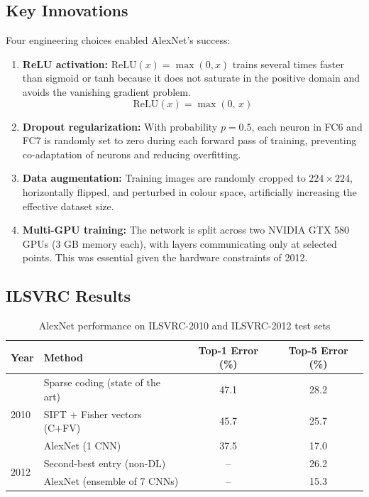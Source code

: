\documentclass[12pt,a4paper]{article}
\begin{document}
\subsection{Key Innovations}

Four engineering choices enabled AlexNet's success:

\begin{enumerate}[leftmargin=2em]
  \item \textbf{ReLU activation:} $\mathrm{ReLU}(x) = \max(0, x)$ trains several times faster than sigmoid or tanh because it does not saturate in the positive domain and avoids the vanishing gradient problem.
  \begin{equation}
    \mathrm{ReLU}(x) = \max(0,\, x)
    \label{eq:relu}
  \end{equation}
  \item \textbf{Dropout regularization:} With probability $p=0.5$, each neuron in FC6 and FC7 is randomly set to zero during each forward pass of training, preventing co-adaptation of neurons and reducing overfitting.
  \item \textbf{Data augmentation:} Training images are randomly cropped to $224\times224$, horizontally flipped, and perturbed in colour space, artificially increasing the effective dataset size.
  \item \textbf{Multi-GPU training:} The network is split across two NVIDIA GTX 580 GPUs (3 GB memory each), with layers communicating only at selected points. This was essential given the hardware constraints of 2012.
\end{enumerate}

\subsection{ILSVRC Results}

\begin{table}[ht]
\centering
\caption{AlexNet performance on ILSVRC-2010 and ILSVRC-2012 test sets}
\label{tab:alexnet_results}
\begin{tabular}{@{}llcc@{}}
\toprule
Year & Method & Top-1 Error (\%) & Top-5 Error (\%) \\
\midrule
\multirow{3}{*}{2010}
  & Sparse coding (state of the art)   & 47.1 & 28.2 \\
  & SIFT + Fisher vectors (C+FV)        & 45.7 & 25.7 \\
  & AlexNet (1 CNN)                     & 37.5 & 17.0 \\
\midrule
\multirow{2}{*}{2012}
  & Second-best entry (non-DL)          & --   & 26.2 \\
  & AlexNet (ensemble of 7 CNNs)        & --   & 15.3 \\
\bottomrule
\end{tabular}
\end{table}
\end{document}
